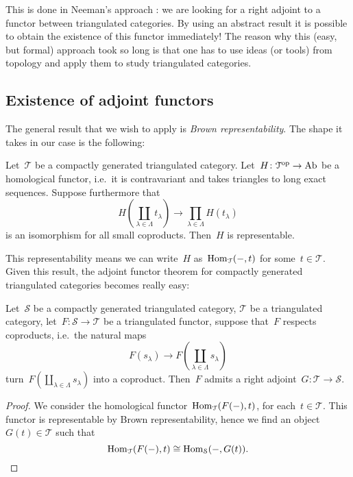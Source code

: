 \documentclass[10pt,a4paper]{article}
\begin{document}
This is done in Neeman's approach \cite{neeman-grothendieck-duality-bousfield-brown}: we are looking for a right adjoint to a functor between triangulated categories. By using an abstract result it is possible to obtain the existence of this functor immediately! The reason why this (easy, but formal) approach took so long is that one has to use ideas (or tools) from topology and apply them to study triangulated categories.

\subsection{Existence of adjoint functors}
The general result that we wish to apply is \emph{Brown representability}. The shape it takes in our case is the following:
\begin{theorem}
  \label{theorem:brown-representability}
  Let~$\mathcal{T}$ be a compactly generated triangulated category. Let~$H\colon\mathcal{T}^{\mathrm{op}}\to\mathrm{Ab}$ be a homological functor, i.e.\ it is contravariant and takes triangles to long exact sequences. Suppose furthermore that
  \begin{equation}
    H\left( \coprod_{\lambda\in\Lambda}t_\lambda \right)\to\prod_{\lambda\in\Lambda}H(t_\lambda)
  \end{equation}
  is an isomorphism for all small coproducts. Then~$H$ is representable.
\end{theorem}
This representability means we can write~$H$ as~$\operatorname{Hom}_{\mathcal{T}}(-,t)$ for some~$t\in\mathcal{T}$. Given this result, the adjoint functor theorem for compactly generated triangulated categories becomes really easy:
\begin{theorem}
  Let~$\mathcal{S}$ be a compactly generated triangulated category, $\mathcal{T}$ be a triangulated category, let~$F\colon\mathcal{S}\to\mathcal{T}$ be a triangulated functor, suppose that~$F$ respects coproducts, i.e.\ the natural maps
  \begin{equation}
    F(s_\lambda)\to F\left( \coprod_{\lambda\in\Lambda}s_\lambda \right)
  \end{equation}
  turn~$F(\coprod_{\lambda\in\Lambda}s_\lambda)$ into a coproduct. Then~$F$ admits a right adjoint~$G\colon\mathcal{T}\to\mathcal{S}$.

  \begin{proof}
    We consider the homological functor~$\operatorname{Hom}_{\mathcal{T}}(F(-),t)$, for each~$t\in\mathcal{T}$. This functor is representable by Brown representability, hence we find an object~$G(t)\in\mathcal{T}$ such that
    \begin{equation}
      \operatorname{Hom}_{\mathcal{T}}(F(-),t)\cong\operatorname{Hom}_{\mathcal{S}}(-,G(t)).
    \end{equation}
  \end{proof}
\end{theorem}
\end{document}
